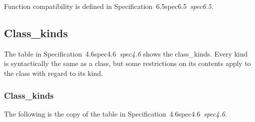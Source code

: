 \documentclass[10pt,b5paper]{article}
\def\specrefx#1#2{Specification~#1\ifx\relax#2\relax{}\else~{\it{}#2}\fi}
\def\specref#1{\specrefx{#1}{\csname spec#1\endcsname}}
\begin{document}
Function compatibility is defined in \specref{6.5}.


\subsection{Class_kinds}

The table in \specref{4.6}\/ shows the class_kinds.  Every kind is
syntactically the same as a class, but some restrictions on its
contents apply to the class with regard to its kind.

\subsubsection*{Class_kinds}\label{sec:class-kinds}

The following is the copy of the table in \specref{4.6}.
\end{document}
